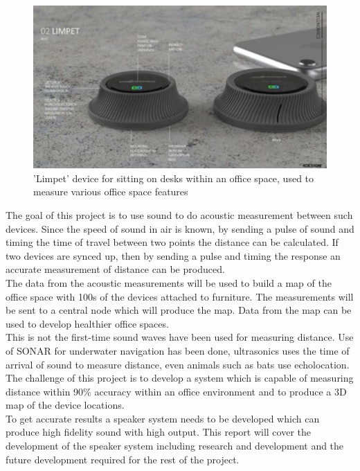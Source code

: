 \documentclass[12pt, a4paper]{article}
\begin{document}
\begin{figure}[!htb]
	\hfill\includegraphics[width=\textwidth]{./Figures/Limpet_Image}\hspace*{\fill}
	\caption{'Limpet' device for sitting on desks within an office space, used to measure various office space features}
	\label{fig:limpetImage}
\end{figure}

The goal of this project is to use sound to do acoustic measurement between such devices. Since the speed of sound in air is known, by sending a pulse of sound and timing the time of travel between two points the distance can be calculated. If two devices are synced up, then by sending a pulse and timing the response an accurate measurement of distance can be produced. \\

The data from the acoustic measurements will be used to build a map of the office space with 100s of the devices attached to furniture. The measurements will be sent to a central node which will produce the map. Data from the map can be used to develop healthier office spaces. \\

This is not the first-time sound waves have been used for measuring distance. Use of SONAR for underwater navigation has been done, ultrasonics uses the time of arrival of sound to measure distance, even animals such as bats use echolocation. The challenge of this project is to develop a system which is capable of measuring distance within 90\% accuracy within an office environment and to produce a 3D map of the device locations. \\

To get accurate results a speaker system needs to be developed which can produce high fidelity sound with high output. This report will cover the development of the speaker system including research and development and the future development required for the rest of the project. \\
\end{document}
